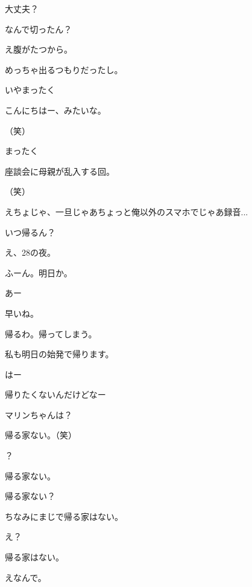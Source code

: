 \begin{multicols}{3}
{        大丈夫？

        なんで切ったん？

        え腹がたつから。

        めっちゃ出るつもりだったし。

        いやまったく

        こんにちはー、みたいな。

        （笑）

        まったく

        座談会に母親が乱入する回。

        （笑）

        えちょじゃ、一旦じゃあちょっと俺以外のスマホでじゃあ録音...

    

    


    

        いつ帰るん？

        え、28の夜。

        ふーん。明日か。

        あー

        早いね。

        帰るわ。帰ってしまう。

        私も明日の始発で帰ります。

        はー

        帰りたくないんだけどなー

        マリンちゃんは？

        帰る家ない。（笑）

        ？

        帰る家ない。

        帰る家ない？

        ちなみにまじで帰る家はない。

        え？

        帰る家はない。

        えなんで。

}
\end{multicols}

